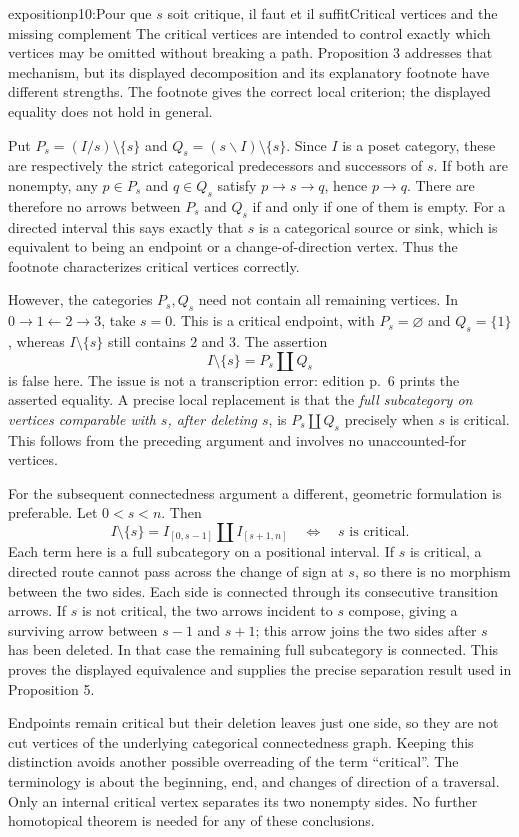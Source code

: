 \begin{dcomment}{exposition}{p10:Pour que $s$ soit critique, il faut et il suffit}{Critical vertices and the missing complement}
The critical vertices are intended to control exactly which vertices may be omitted without breaking a path. Proposition 3 addresses that mechanism, but its displayed decomposition and its explanatory footnote have different strengths. The footnote gives the correct local criterion; the displayed equality does not hold in general.

Put $P_s=(I/s)\setminus\{s\}$ and $Q_s=(s\backslash I)\setminus\{s\}$. Since $I$ is a poset category, these are respectively the strict categorical predecessors and successors of $s$. If both are nonempty, any $p\in P_s$ and $q\in Q_s$ satisfy $p\to s\to q$, hence $p\to q$. There are therefore no arrows between $P_s$ and $Q_s$ if and only if one of them is empty. For a directed interval this says exactly that $s$ is a categorical source or sink, which is equivalent to being an endpoint or a change-of-direction vertex. Thus the footnote characterizes critical vertices correctly.

However, the categories $P_s,Q_s$ need not contain all remaining vertices. In $0\to1\leftarrow2\to3$, take $s=0$. This is a critical endpoint, with $P_s=\varnothing$ and $Q_s=\{1\}$, whereas $I\setminus\{s\}$ still contains $2$ and $3$. The assertion
\[
I\setminus\{s\}=P_s\amalg Q_s
\]
is false here. The issue is not a transcription error: edition p.~6 prints the asserted equality. A precise local replacement is that the \emph{full subcategory on vertices comparable with $s$, after deleting $s$}, is $P_s\amalg Q_s$ precisely when $s$ is critical. This follows from the preceding argument and involves no unaccounted-for vertices.

For the subsequent connectedness argument a different, geometric formulation is preferable. Let $0<s<n$. Then
\[
I\setminus\{s\}=I_{[0,s-1]}\amalg I_{[s+1,n]}
\quad\Longleftrightarrow\quad s\text{ is critical}.
\]
Each term here is a full subcategory on a positional interval. If $s$ is critical, a directed route cannot pass across the change of sign at $s$, so there is no morphism between the two sides. Each side is connected through its consecutive transition arrows. If $s$ is not critical, the two arrows incident to $s$ compose, giving a surviving arrow between $s-1$ and $s+1$; this arrow joins the two sides after $s$ has been deleted. In that case the remaining full subcategory is connected. This proves the displayed equivalence and supplies the precise separation result used in Proposition 5.

Endpoints remain critical but their deletion leaves just one side, so they are not cut vertices of the underlying categorical connectedness graph. Keeping this distinction avoids another possible overreading of the term ``critical''. The terminology is about the beginning, end, and changes of direction of a traversal. Only an internal critical vertex separates its two nonempty sides. No further homotopical theorem is needed for any of these conclusions.
\end{dcomment}

